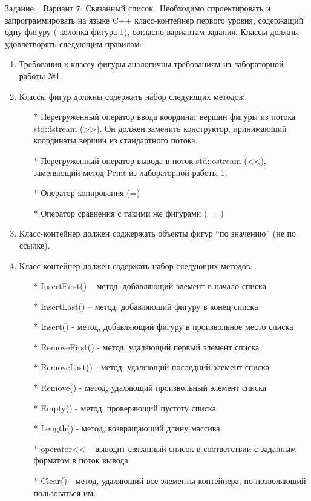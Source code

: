 \documentclass[12pt]{article}
\begin{document}
Задание: \
Вариант 7: Связанный список.\
Необходимо спроектировать и запрограммировать на языке C++ класс-контейнер первого уровня, содержащий одну фигуру ( колонка фигура 1), согласно вариантам задания. Классы должны удовлетворять следующим правилам:
\begin{enumerate}
\item Требования к классу фигуры аналогичны требованиям из лабораторной работы №1.
\item Классы фигур должны содержать набор следующих методов:
\begin{itemsize}
\begin{enumerate}
    \item[*] Перегруженный оператор ввода координат вершин фигуры из потока std::istream (>>). Он должен заменить конструктор, принимающий координаты вершин из стандартного потока.
    \item[*] Перегруженный оператор вывода в поток std::ostream (<<), заменяющий метод Print из лабораторной работы 1. 
    \item[*] Оператор копирования (=)
    \item[*] Оператор сравнения с такими же фигурами (==)
\end{enumerate}
\end{itemsize}
\item Класс-контейнер должен соджержать объекты фигур “по значению” (не по ссылке).
\item Класс-контейнер должен содержать набор следующих методов:
\begin{itemsize}
\begin{enumerate}
InsertLast(const Polygon& polygon);
  // Метод, добавляющий фигуру в произвольное место списка

    \item[*] InsertFirst() – метод, добавляющий элемент в начало списка
    \item[*] InsertLast() – метод, добавляющий фигуру в конец списка
    \item[*] Insert() - метод, добавляющий фигуру в произвольное место списка
    \item[*] RemoveFirst() - метод, удаляющий первый элемент списка
    \item[*] RemoveLast() - метод, удаляющий последний элемент списка
    \item[*] Remove() - метод, удаляющий произвольный элемент списка
    \item[*] Empty() - метод, проверяющий пустоту списка
    \item[*] Length() - метод, возвращающий длину массива
    \item[*] operator<< – выводит связанный список в соответствии с заданным форматом в поток вывода
    \item[*] Clear() - метод, удаляющий все элементы контейнера, но позволяющий пользоваться им.
\end{enumerate}
\end{itemsize}
\end{enumerate}
\end{document}
